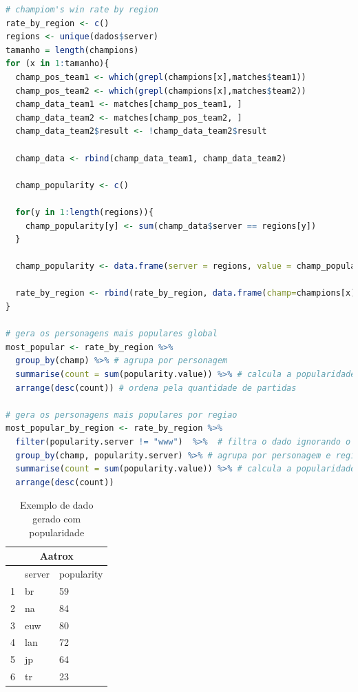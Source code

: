 \documentclass[a4paper]{article}
\begin{document}
\begin{lstlisting}[language=R, caption={Gerando novos dados a partir de um conjunto maior},label={cod:mostpop}]
# champiom's win rate by region
rate_by_region <- c()
regions <- unique(dados$server)
tamanho = length(champions)
for (x in 1:tamanho){
  champ_pos_team1 <- which(grepl(champions[x],matches$team1))
  champ_pos_team2 <- which(grepl(champions[x],matches$team2))
  champ_data_team1 <- matches[champ_pos_team1, ]
  champ_data_team2 <- matches[champ_pos_team2, ]
  champ_data_team2$result <- !champ_data_team2$result
  
  champ_data <- rbind(champ_data_team1, champ_data_team2)
  
  champ_popularity <- c()
  
  for(y in 1:length(regions)){
    champ_popularity[y] <- sum(champ_data$server == regions[y])
  }

  champ_popularity <- data.frame(server = regions, value = champ_popularity)
  
  rate_by_region <- rbind(rate_by_region, data.frame(champ=champions[x], champ_rate_by_region, popularity = champ_popularity))
}

# gera os personagens mais populares global
most_popular <- rate_by_region %>%
  group_by(champ) %>% # agrupa por personagem
  summarise(count = sum(popularity.value)) %>% # calcula a popularidade
  arrange(desc(count)) # ordena pela quantidade de partidas

# gera os personagens mais populares por regiao
most_popular_by_region <- rate_by_region %>%
  filter(popularity.server != "www")  %>%  # filtra o dado ignorando o servidor www
  group_by(champ, popularity.server) %>% # agrupa por personagem e regiao
  summarise(count = sum(popularity.value)) %>% # calcula a popularidade
  arrange(desc(count))
\end{lstlisting}

\begin{table}[ht]
\centering
\caption{Exemplo de dado gerado com popularidade}
\begin{tabular}{|l|l|l|}
\hline
\multicolumn{3}{|c|}{Aatrox} \\ \hline
 & server & popularity \\ \hline
1 & br & 59 \\ \hline
2 & na & 84 \\ \hline
3 & euw & 80 \\ \hline
4 & lan & 72 \\ \hline
5 & jp & 64 \\ \hline
6 & tr & 23 \\ \hline
\end{tabular}
\label{table:popregion}
\end{table}
\end{document}
